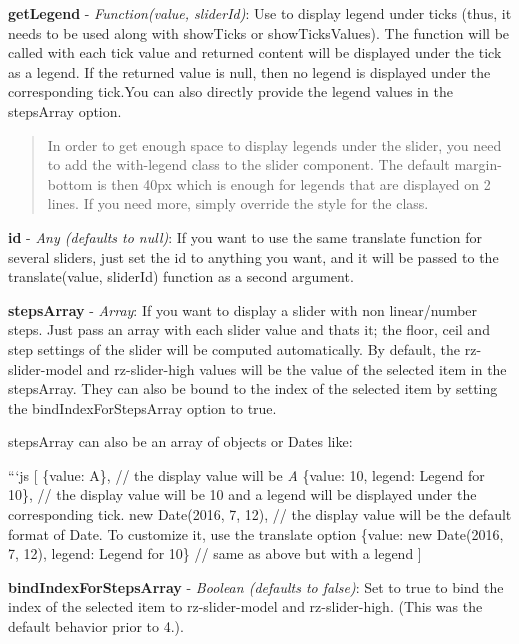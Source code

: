 {\bfseries get\+Legend} -\/ {\itshape Function(value, slider\+Id)}\+: Use to display legend under ticks (thus, it needs to be used along with {\ttfamily show\+Ticks} or {\ttfamily show\+Ticks\+Values}). The function will be called with each tick value and returned content will be displayed under the tick as a legend. If the returned value is null, then no legend is displayed under the corresponding tick.\+You can also directly provide the legend values in the {\ttfamily steps\+Array} option. \begin{quote}
In order to get enough space to display legends under the slider, you need to add the {\ttfamily with-\/legend} class to the slider component. The default margin-\/bottom is then 40px which is enough for legends that are displayed on 2 lines. If you need more, simply override the style for the class. \end{quote}


{\bfseries id} -\/ {\itshape Any (defaults to null)}\+: If you want to use the same {\ttfamily translate} function for several sliders, just set the {\ttfamily id} to anything you want, and it will be passed to the {\ttfamily translate(value, slider\+Id)} function as a second argument.

{\bfseries steps\+Array} -\/ {\itshape Array}\+: If you want to display a slider with non linear/number steps. Just pass an array with each slider value and that\textquotesingle{}s it; the floor, ceil and step settings of the slider will be computed automatically. By default, the {\ttfamily rz-\/slider-\/model} and {\ttfamily rz-\/slider-\/high} values will be the value of the selected item in the steps\+Array. They can also be bound to the index of the selected item by setting the {\ttfamily bind\+Index\+For\+Steps\+Array} option to {\ttfamily true}.

{\ttfamily steps\+Array} can also be an array of objects or Dates like\+:

```js \mbox{[} \{value\+: \textquotesingle{}A\textquotesingle{}\}, // the display value will be {\itshape A} \{value\+: 10, legend\+: \textquotesingle{}Legend for 10\textquotesingle{}\}, // the display value will be 10 and a legend will be displayed under the corresponding tick. new Date(2016, 7, 12), // the display value will be the default format of Date. To customize it, use the {\ttfamily translate} option \{value\+: new Date(2016, 7, 12), legend\+: \textquotesingle{}Legend for 10\textquotesingle{}\} // same as above but with a legend \mbox{]} 

{\bfseries bind\+Index\+For\+Steps\+Array} -\/ {\itshape Boolean (defaults to false)}\+: Set to true to bind the index of the selected item to {\ttfamily rz-\/slider-\/model} and {\ttfamily rz-\/slider-\/high}. (This was the default behavior prior to 4.).

